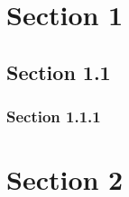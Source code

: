 \hypertarget{_section_1}{\section{Section 1}}
\hypertarget{_section_1.1}{\subsection{Section 1.1}}
\hypertarget{_section_1.1.1}{\subsubsection{Section 1.1.1}}
\hypertarget{_section_2}{\section{Section 2}}
